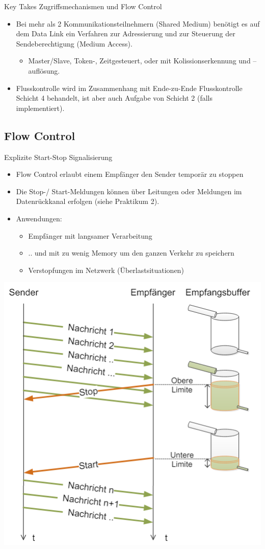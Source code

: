 \begin{KR}{Key Takes Zugriffsmechanismen und Flow Control}
\begin{itemize}
    \item Bei mehr als 2 Kommunikationsteilnehmern (Shared Medium) benötigt es auf dem Data Link ein Verfahren zur Adressierung und zur Steuerung der Sendeberechtigung (Medium Access).
    \begin{itemize}
        \item Master/Slave, Token-, Zeitgesteuert, oder mit Kolissionserkennung und –auflösung.
    \end{itemize}
    \item Flusskontrolle wird im Zusammenhang mit Ende-zu-Ende Flusskontrolle Schicht 4 behandelt, ist aber auch Aufgabe von Schicht 2 (falls implementiert).
\end{itemize}
\end{KR}

\subsection{Flow Control}

\begin{definition}{Explizite Start-Stop Signalisierung}
    \begin{itemize}
        \item Flow Control erlaubt einem Empfänger den Sender temporär zu stoppen
        \item Die Stop-/ Start-Meldungen können über Leitungen oder Meldungen im Datenrückkanal erfolgen (siehe Praktikum 2).
        \item Anwendungen:
        \begin{itemize}
            \item Empfänger mit langsamer Verarbeitung
            \item .. und mit zu wenig Memory um den ganzen Verkehr zu speichern
            \item Verstopfungen im Netzwerk (Überlastsituationen)
        \end{itemize}
    \end{itemize}
        \includegraphics[width=0.5\linewidth]{images/flow_control1.png}
\end{definition}

